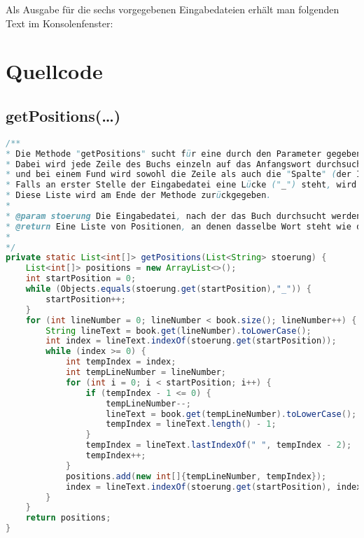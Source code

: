 \documentclass[a4paper, 10pt, ngerman]{scrartcl}
\begin{document}
Als Ausgabe für die sechs vorgegebenen Eingabedateien erhält man folgenden Text im Konsolenfenster:

\begin{figure}[h]

\end{figure}



\clearpage


\section{Quellcode}\label{sec:quellcode}
\subsection{getPositions(\ldots)}\label{sec:getPositions()}
\begin{lstlisting}[frame=single, language=Java, title=Methode getPositions, breaklines=true, label=lst:getPosition]
/**
* Die Methode "getPositions" sucht für eine durch den Parameter gegebene Eingabedatei das erste Wort im Buch.
* Dabei wird jede Zeile des Buchs einzeln auf das Anfangswort durchsucht
* und bei einem Fund wird sowohl die Zeile als auch die "Spalte" (der Index in der Zeile, an der das Wort beginnt) als Array an die Liste von Positionen hinzugefügt.
* Falls an erster Stelle der Eingabedatei eine Lücke ("_") steht, wird nach dem zweiten Wort gesucht und dann die Position für das vorherige Wort bestimmt.
* Diese Liste wird am Ende der Methode zurückgegeben.
*
* @param stoerung Die Eingabedatei, nach der das Buch durchsucht werden soll
* @return Eine Liste von Positionen, an denen dasselbe Wort steht wie das erste Wort der Eingabedatei
*
*/
private static List<int[]> getPositions(List<String> stoerung) {
	List<int[]> positions = new ArrayList<>();
    int startPosition = 0;
    while (Objects.equals(stoerung.get(startPosition),"_")) {
    	startPosition++;
    }
    for (int lineNumber = 0; lineNumber < book.size(); lineNumber++) {
        String lineText = book.get(lineNumber).toLowerCase();
        int index = lineText.indexOf(stoerung.get(startPosition));
        while (index >= 0) {
        	int tempIndex = index;
            int tempLineNumber = lineNumber;
            for (int i = 0; i < startPosition; i++) {
                if (tempIndex - 1 <= 0) {
                    tempLineNumber--;
                    lineText = book.get(tempLineNumber).toLowerCase();
                    tempIndex = lineText.length() - 1;
                }
                tempIndex = lineText.lastIndexOf(" ", tempIndex - 2);
                tempIndex++;
            }
            positions.add(new int[]{tempLineNumber, tempIndex});
            index = lineText.indexOf(stoerung.get(startPosition), index + 1);
        }
    }
    return positions;
}
\end{lstlisting}
\end{document}
